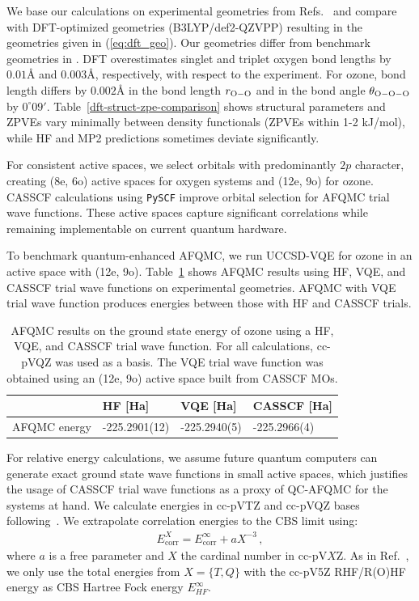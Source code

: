 \documentclass[../main.tex]{subfiles}
\begin{document}
We base our calculations on experimental geometries from Refs.~\cite{tanaka1970coriolis, krupenie1972spectrum} and compare with DFT-optimized geometries (B3LYP/def2-QZVPP) \cite{Becke1993b3lyp, Weigend2005def2bases} resulting in the geometries given in (\ref{eq:dft_geo}). Our geometries differ from benchmark geometries in \cite{feller2008survey}. DFT overestimates singlet and triplet oxygen bond lengths by $0.01\text{\AA}$ and $0.003\text{\AA}$, respectively, with respect to the experiment. For ozone, bond length differs by $0.002\text{\AA}$ in the bond length $r_\mathrm{\ce{O}-\ce{O}}$ and in the bond angle $\theta_{\ce{O}-\ce{O}-\ce{O}}$ by $0^{\circ}09'$. Table~\ref{dft-struct-zpe-comparison} shows structural parameters and ZPVEs vary minimally between density functionals (ZPVEs within 1-2 kJ/mol), while HF and MP2 predictions sometimes deviate significantly.

For consistent active spaces, we select orbitals with predominantly $2p$ character, creating (8e, 6o) active spaces for oxygen systems and (12e, 9o) for ozone. \ac{CASSCF} calculations using \texttt{PySCF} \cite{sun2018pyscf} improve orbital selection for AFQMC trial wave functions. These active spaces capture significant correlations while remaining implementable on current quantum hardware.

To benchmark quantum-enhanced AFQMC, we run UCCSD-VQE for ozone in an active space with (12e, 9o). Table~\ref{tab:ozone_vqe} shows AFQMC results using HF, VQE, and CASSCF trial wave functions on experimental geometries. AFQMC with VQE trial wave function produces energies between those with HF and CASSCF trials.

\begin{table}[]
\begin{tabular}{l|l|l|l}
& HF [Ha]     & VQE [Ha]  & CASSCF [Ha]   \\ \hline
AFQMC energy & -225.2901(12) & -225.2940(5) & -225.2966(4) 
\end{tabular}
\caption{\label{tab:ozone_vqe}
AFQMC results on the ground state energy of ozone using a HF, VQE, and CASSCF trial wave function. For all calculations, cc-pVQZ was used as a basis. The VQE trial wave function was obtained using an (12e, 9o) active space built from CASSCF MOs.}
\end{table}

For relative energy calculations, we assume future quantum computers can generate exact ground state wave functions in small active spaces, which justifies the usage of CASSCF trial wave functions as a proxy of QC-AFQMC for the systems at hand. We calculate energies in cc-pVTZ and cc-pVQZ bases \cite{dunning1989gaussian} following~\cite{helgaker1997basis, lee2020utilizing}. We extrapolate correlation energies to the \ac{CBS} limit using:
\begin{align}\label{eq:cbs}
    E_\mathrm{corr}^X = E_\mathrm{corr}^\infty+a X^{-3}\,,   
\end{align}
where $a$ is a free parameter and $X$ the cardinal number in cc-pV$X$Z. As in Ref.~\cite{lee2020utilizing}, we only use the total energies from $X=\{T,Q\}$ with the cc-pV5Z RHF/R(O)HF energy as CBS Hartree Fock energy $E_{HF}^\infty$.   
\end{document}
